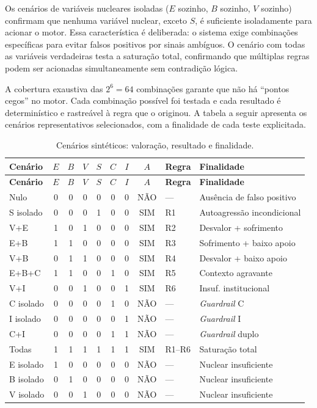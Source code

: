 \documentclass[
    12pt,
    openright,
    oneside,
    a4paper,
    english,
    brazil
]{abntex2}
\begin{document}
Os cen\'arios de vari\'aveis nucleares isoladas ($E$ sozinho, $B$ sozinho, $V$ sozinho) confirmam que nenhuma vari\'avel nuclear, exceto $S$, \'e suficiente isoladamente para acionar o motor. Essa caracter\'istica \'e deliberada: o sistema exige combina\c{c}\~oes espec\'ificas para evitar falsos positivos por sinais amb\'iguos. O cen\'ario com todas as vari\'aveis verdadeiras testa a satura\c{c}\~ao total, confirmando que m\'ultiplas regras podem ser acionadas simultaneamente sem contradi\c{c}\~ao l\'ogica.

A cobertura exaustiva das $2^6 = 64$ combina\c{c}\~oes garante que n\~ao h\'a ``pontos cegos'' no motor. Cada combina\c{c}\~ao poss\'ivel foi testada e cada resultado \'e determin\'istico e rastre\'avel \`a regra que o originou. A tabela a seguir apresenta os cen\'arios representativos selecionados, com a finalidade de cada teste explicitada.

\begin{longtable}{lcccccc c ll}
\caption{Cen\'arios sint\'eticos: valora\c{c}\~ao, resultado e finalidade.} \label{tab:cenarios_finalidade} \\
\toprule
\textbf{Cen\'ario} & $E$ & $B$ & $V$ & $S$ & $C$ & $I$ & $A$ & \textbf{Regra} & \textbf{Finalidade} \\
\midrule
\endfirsthead
\toprule
\textbf{Cen\'ario} & $E$ & $B$ & $V$ & $S$ & $C$ & $I$ & $A$ & \textbf{Regra} & \textbf{Finalidade} \\
\midrule
\endhead
Nulo            & 0 & 0 & 0 & 0 & 0 & 0 & N\~AO & ---  & Aus\^encia de falso positivo \\
S isolado       & 0 & 0 & 0 & 1 & 0 & 0 & SIM & R1   & Autoagress\~ao incondicional \\
V+E             & 1 & 0 & 1 & 0 & 0 & 0 & SIM & R2   & Desvalor + sofrimento \\
E+B             & 1 & 1 & 0 & 0 & 0 & 0 & SIM & R3   & Sofrimento + baixo apoio \\
V+B             & 0 & 1 & 1 & 0 & 0 & 0 & SIM & R4   & Desvalor + baixo apoio \\
E+B+C           & 1 & 1 & 0 & 0 & 1 & 0 & SIM & R5   & Contexto agravante \\
V+I             & 0 & 0 & 1 & 0 & 0 & 1 & SIM & R6   & Insuf. institucional \\
C isolado       & 0 & 0 & 0 & 0 & 1 & 0 & N\~AO & ---  & \textit{Guardrail} C \\
I isolado       & 0 & 0 & 0 & 0 & 0 & 1 & N\~AO & ---  & \textit{Guardrail} I \\
C+I             & 0 & 0 & 0 & 0 & 1 & 1 & N\~AO & ---  & \textit{Guardrail} duplo \\
Todas           & 1 & 1 & 1 & 1 & 1 & 1 & SIM & R1--R6 & Satura\c{c}\~ao total \\
E isolado       & 1 & 0 & 0 & 0 & 0 & 0 & N\~AO & ---  & Nuclear insuficiente \\
B isolado       & 0 & 1 & 0 & 0 & 0 & 0 & N\~AO & ---  & Nuclear insuficiente \\
V isolado       & 0 & 0 & 1 & 0 & 0 & 0 & N\~AO & ---  & Nuclear insuficiente \\
\bottomrule
\end{longtable}
\end{document}
